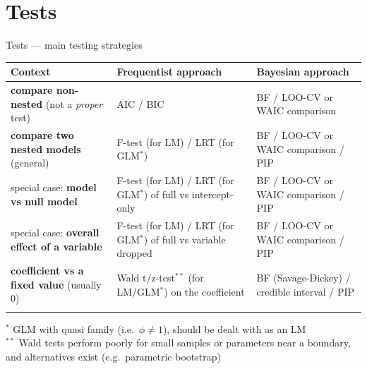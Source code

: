 \documentclass[
  10pt,
  ignorenonframetext,
  aspectratio=169,
  t]{beamer}
\newcounter{none} %
\begin{document}
\section{Tests}\label{tests}

\begin{frame}{Tests --- main testing strategies}
\protect{}\label{tests-main-testing-strategies}
\scriptsize

{\def\LTcaptype{none} %
\begin{longtable}[]{@{}
  >{\raggedright\arraybackslash}p{}
  >{\raggedright\arraybackslash}p{}
  >{\raggedright\arraybackslash}p{}@{}}
\toprule\noalign{}
\begin{minipage}[b]{\linewidth}\raggedright
Context
\end{minipage} & \begin{minipage}[b]{\linewidth}\raggedright
Frequentist approach
\end{minipage} & \begin{minipage}[b]{\linewidth}\raggedright
Bayesian approach
\end{minipage} \\
\midrule\noalign{}
\endhead
\textbf{compare non-nested} (not a \emph{proper} test) & AIC / BIC & BF
/ LOO-CV or WAIC comparison \\
\textbf{compare two nested models} (general) & F-test (for LM) / LRT
(for GLM\(^*\)) & BF / LOO-CV or WAIC comparison / PIP \\
special case: \textbf{model vs null model} & F-test (for LM) / LRT (for
GLM\(^*\)) of full vs intercept-only & BF / LOO-CV or WAIC comparison /
PIP \\
special case: \textbf{overall effect of a variable} & F-test (for LM) /
LRT (for GLM\(^*\)) of full vs variable dropped & BF / LOO-CV or WAIC
comparison / PIP \\
\textbf{coefficient vs a fixed value} (usually 0) & Wald
t/z-test\(^{**}\) (for LM/GLM\(^*\)) on the coefficient & BF
(Savage-Dickey) / credible interval / PIP \\
\bottomrule\noalign{}
\end{longtable}
}

\vspace{-1em}

\(^*\) GLM with quasi family (i.e.~\(\phi\neq1\)), should be dealt with
as an LM\\
\(^{**}\) Wald tests perform poorly for small samples or parameters near
a boundary, and alternatives exist (e.g.~parametric bootstrap)


\end{frame}
\end{document}
